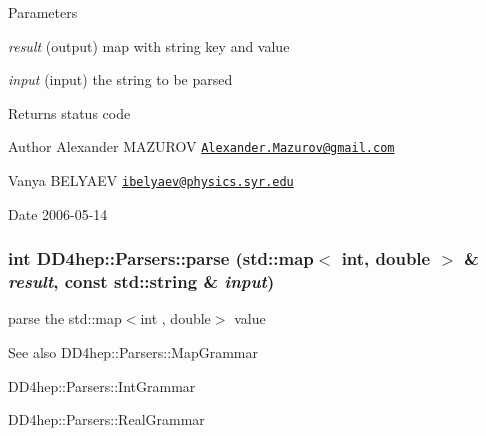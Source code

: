 \begin{DoxyParams}{Parameters}
\item[{\em result}](output) map with string key and value \item[{\em input}](input) the string to be parsed \end{DoxyParams}
\begin{DoxyReturn}{Returns}
status code
\end{DoxyReturn}
\begin{DoxyAuthor}{Author}
Alexander MAZUROV \href{mailto:Alexander.Mazurov@gmail.com}{\tt Alexander.Mazurov@gmail.com} 

Vanya BELYAEV \href{mailto:ibelyaev@physics.syr.edu}{\tt ibelyaev@physics.syr.edu} 
\end{DoxyAuthor}
\begin{DoxyDate}{Date}
2006-\/05-\/14 
\end{DoxyDate}
\hypertarget{namespace_d_d4hep_1_1_parsers_a948c73c7e48e93c657c717952295ce22}{
\subsubsection[{parse}]{\setlength{\rightskip}{0pt plus 5cm}int DD4hep::Parsers::parse (std::map$<$ int, double $>$ \& {\em result}, \/  const std::string \& {\em input})}}
\label{namespace_d_d4hep_1_1_parsers_a948c73c7e48e93c657c717952295ce22}


parse the {\ttfamily std::map$<$int , double$>$} value \begin{DoxySeeAlso}{See also}
DD4hep::Parsers::MapGrammar 

DD4hep::Parsers::IntGrammar 

DD4hep::Parsers::RealGrammar 
\end{DoxySeeAlso}

